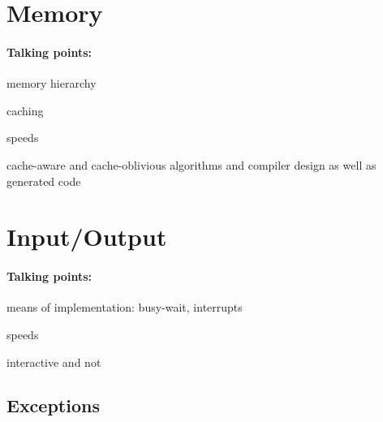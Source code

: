 \section{Memory}\label{background:computers:memory}
\paragraph{Talking points:}
\begin{aenumerate}
\item memory hierarchy
\item caching
\item speeds
\item cache-aware and cache-oblivious algorithms and compiler design as well as generated code
\end{aenumerate}

\section{Input/Output}\label{background:computers:inputoutput}
\paragraph{Talking points:}
\begin{aenumerate}
\item means of implementation: busy-wait, interrupts
\item speeds
\item interactive and not
\end{aenumerate}

\subsection{Exceptions}